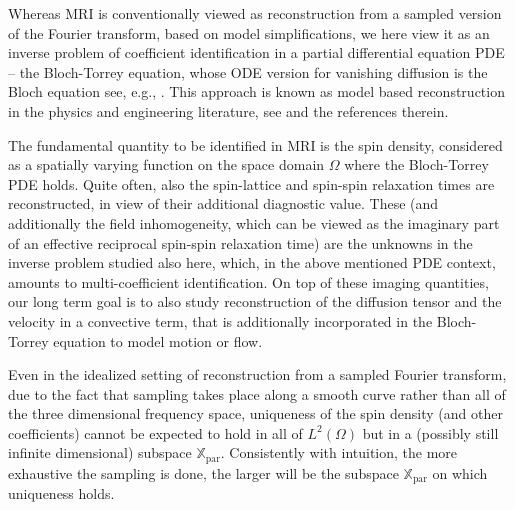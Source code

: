 \documentclass{ws-m3as}
\newcommand\Xpar{\mathbb{X}_{\text{par}}}
\begin{document}
Whereas MRI is conventionally viewed as reconstruction from a sampled version of the Fourier transform, based on model simplifications, we here view it as an inverse problem of coefficient identification in a partial differential equation PDE -- the Bloch-Torrey equation, whose  ODE version for vanishing diffusion is the Bloch equation see, e.g., \cite{bloch46,torrey56,Nishimura2010}.
This approach is known as model based reconstruction in the physics and engineering literature, see \cite{Uecker_Review:2021} and the references therein.

The fundamental quantity to be identified in MRI is the spin density, considered as a spatially varying function on the space domain $\Omega$ where the Bloch-Torrey PDE holds. Quite often, also the spin-lattice and spin-spin relaxation times are reconstructed, in view of their additional diagnostic value.  
These (and additionally the field inhomogeneity, which can be viewed as the imaginary part of an effective  reciprocal spin-spin relaxation time) are the unknowns in the inverse problem studied also here, which, in the above mentioned PDE context, amounts to multi-coefficient identification.
On top of these imaging quantities, 
our long term goal is to also study
reconstruction of the diffusion tensor and the velocity in a convective term, that is additionally incorporated in the Bloch-Torrey equation to model motion or flow.

Even in the idealized setting of reconstruction from a sampled Fourier transform, due to the fact that sampling takes place along a smooth curve rather than all of the three dimensional frequency space, uniqueness of the spin density (and other coefficients) cannot be expected to hold in all of $L^2(\Omega)$ but in a (possibly still infinite dimensional) subspace $\Xpar$.
Consistently with intuition, the more exhaustive the sampling is done, the larger will be the subspace $\Xpar$ on which uniqueness holds.
\end{document}

